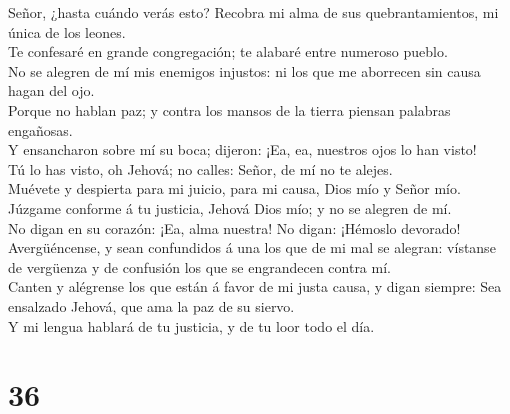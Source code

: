  Señor, ¿hasta cuándo verás esto? Recobra mi alma de sus
quebrantamientos, mi única de los leones.\\
 Te confesaré en grande congregación; te alabaré entre
numeroso pueblo.\\
 No se alegren de mí mis enemigos injustos: ni los que me
aborrecen sin causa hagan del ojo.\\
 Porque no hablan paz; y contra los mansos de la tierra
piensan palabras engañosas.\\
 Y ensancharon sobre mí su boca; dijeron: ¡Ea, ea, nuestros
ojos lo han visto!\\
 Tú lo has visto, oh Jehová; no calles: Señor, de mí no te
alejes.\\
 Muévete y despierta para mi juicio, para mi causa, Dios
mío y Señor mío.\\
 Júzgame conforme á tu justicia, Jehová Dios mío; y no se
alegren de mí.\\
 No digan en su corazón: ¡Ea, alma nuestra! No digan:
¡Hémoslo devorado!\\
 Avergüéncense, y sean confundidos á una los que de mi mal
se alegran: vístanse de vergüenza y de confusión los que se engrandecen
contra mí.\\
 Canten y alégrense los que están á favor de mi justa
causa, y digan siempre: Sea ensalzado Jehová, que ama la paz de su
siervo.\\
 Y mi lengua hablará de tu justicia, y de tu loor todo el
día.

\hypertarget{section-35}{%
\section{36}\label{section-35}}

